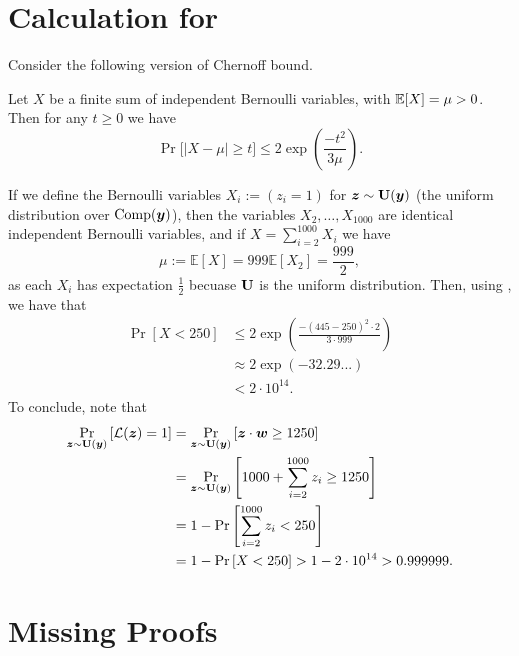 
\section{Calculation for~}
Consider the following version of Chernoff bound.
\begin{lemma}
    Let $X$ be a finite sum of independent Bernoulli variables, with $\mathbb{E}[X] = \mu > 0$. Then for any $t \geq 0$ we have
    \[
    \Pr \Big[ \left|X - \mu\right| \geq t \Big] \leq 2\exp\left(\frac{-t^2}{3 \mu} \right).
    \] 
    
    \label{lemma:chernoff}  
    \end{lemma}
If we define the Bernoulli variables $X_i := (z_i = 1)$ for ${\bm{z}} \sim \mathbf{U}({\bm{y}})$ (the uniform distribution over $\operatorname{Comp}({\bm{y}})$), then the variables $X_2, \ldots, X_{1000}$ are identical independent Bernoulli variables, and if $X = \sum_{i = 2}^{1000} X_i$ we have 
\[
    \mu := \mathbb{E}[X] =  999\mathbb{E}[X_2] = \frac{999}{2},
\]
as each $X_i$ has expectation $\frac{1}{2}$ becuase $\mathbf{U}$ is the uniform distribution. Then, using , we have that 
\begin{align*}
    \Pr\left[ X < 250 \right] &\leq 2 \exp\left(\frac{-(445-250)^2    \cdot 2}{3 \cdot 999}\right)\\ &\approx 2 \exp(-32.29...)\\ &< 2 \cdot 10^{14}.
\end{align*}
To conclude, note that
\begin{align*}
    \Pr_{{\bm{z}} \sim \mathbf{U}({\bm{y}})}
     \left[\mathcal{L}({\bm{z}}) = 1 \right] 
      &= \Pr_{{\bm{z}} \sim \mathbf{U}({\bm{y}})}
    \left[{\bm{z}} \cdot {\bm{w}} \geq 1250 \right]\\
    &= \Pr_{{\bm{z}} \sim \mathbf{U}({\bm{y}})}\left[1000 + \sum_{i=2}^{1000}{z_i} \geq 1250\right]\\
    &= 1 - \Pr\left[\sum_{i=2}^{1000}{z_i} < 250\right]\\
    &= 1 - \Pr\left[ X < 250 \right] > 1 - 2\cdot 10^{14} > 0.999999.
\end{align*}
    

\section{Missing Proofs}

